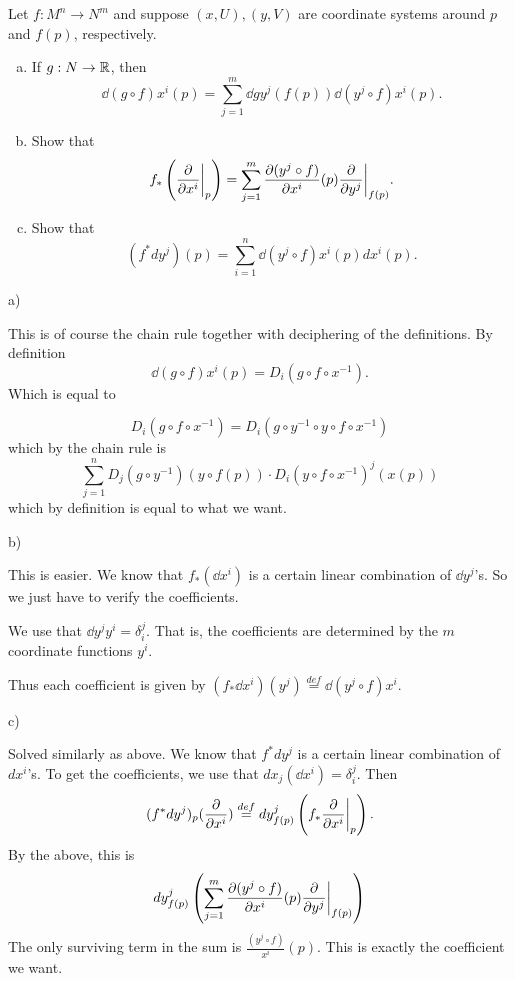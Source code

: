 \documentclass[11pt, english]{article}
\begin{document}
\begin{exc}[Exc 1]
Let $f:M^n \to N^m$ and suppose $(x,U),(y,V)$ are coordinate systems around $p$ and $f(p)$, respectively.
\begin{enumerate}[a)]
\item If $g:N \to \mathbb{R}$, then
\[
\dd{(g \circ f)}{x^i}(p) = \sum_{j=1}^m \dd{g}{y^j}(f(p)) \dd{(y^j \circ f)}{x^i} (p).
\]
\item Show that
\[
f_\ast \left( \restr{\dd{}{x^i}}{p} \right) = \sum_{j=1}^m \dd{(y^j \circ f)}{x^i}(p) \restr{\dd{}{y^j}}{f(p)}.
\]
\item 
Show that
$$
(f^\ast dy^j)(p) = \sum_{i=1}^n \dd{(y^j \circ f)}{x^i}(p) dx^i(p).
$$
\end{enumerate}
\end{exc}
\begin{sol}
a)

This is of course the chain rule together with deciphering of the definitions. By definition
$$
\dd{ (g \circ f)}{x^i}(p) = D_i(g \circ f \circ x^{-1}).
$$
Which is equal to

$$
 D_i(g \circ f \circ x^{-1}) =  D_i(g \circ y^{-1} \circ y \circ  f \circ x^{-1})
$$
which by the chain rule is
$$
\sum_{j=1}^n D_j(g \circ y^{-1})(y \circ f(p)) \cdot D_i(y \circ f \circ x^{-1})^j ( x(p)) 
$$
which by definition is equal to what we want.

b)

This is easier. We know that $f_\ast( \dd{}{x^i})$ is a certain linear combination of $\dd{}{y^j}$'s. So we just have to verify the coefficients.

We use that $\dd{}{y^j} y^i = \delta_i^j$. That is, the coefficients are determined by the $m$ coordinate functions $y^i$. 

Thus each coefficient is given by $(f_\ast \dd{}{x^i})(y^j) \stackrel{def}{=} \dd{(y^j \circ f)}{x^i}$.


c)

Solved similarly as above. We know that $f^\ast dy^j$ is a certain linear combination of $dx^i$'s. To get the coefficients, we use that $dx_j(\dd{}{x^i})= \delta_i^j$. Then
$$
(f^\ast dy^j)_p(\dd{}{x^i}) \stackrel{def}{=} dy^j_{f(p)} \left(f_\ast \restr{\dd{}{x^i}}{p}\right).
$$
By the above, this is
$$
dy^j_{f(p)} \left( \sum_{j=1}^m \dd{(y^j \circ f)}{x^i}(p) \restr{\dd{}{y^j}}{f(p)}\right)
$$
The only surviving term in the sum is $\frac{(y^j \circ f)}{x^i}(p)$. This is exactly the coefficient we want.

\end{sol}
\end{document}
